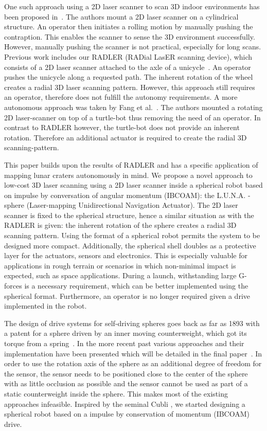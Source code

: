 \documentclass[graybox]{svmult}
\newcommand{\1}{\mathbbm{1}}                 %
\begin{document}
One such approach using a 2D laser scanner to scan 3D indoor environments has been proposed in~\cite{classical_mechanics_scanner}.
The authors mount a 2D laser scanner on a cylindrical structure.
An operator then initiates a rolling motion by manually pushing the contraption.
This enables the scanner to sense the 3D environment successfully.
However, manually pushing the scanner is not practical, especially for long scans.
%
Previous work includes our RADLER (RADial LasER scanning device), which consists of a 2D laser scanner attached to the axle of a unicycle~\cite{ISER2018}.
An operator pushes the unicycle along a requested path.
The inherent rotation of the wheel creates a radial 3D laser scanning pattern.
However, this approach still requires an operator, therefore does not fulfill the autonomy requirements. 
%
A more autonomous approach was taken by Fang et al.~\cite{3D_per_2D_based}.
The authors mounted a rotating 2D laser-scanner on top of a turtle-bot thus removing the need of an operator.
In contrast to RADLER however, the turtle-bot does not provide an inherent rotation.
Therefore an additional actuator is required to create the radial 3D scanning-pattern. 

This paper builds upon the results of RADLER and has a specific application of mapping lunar craters autonomously in mind.
We propose a novel approach to low-cost 3D laser scanning using a 2D laser scanner inside a spherical robot based on impulse by conversation of angular momentum (IBCOAM): the L.U.N.A. - sphere (Laser-mapping Unidirectional Navigation Actuator).
The 2D laser scanner is fixed to the spherical structure, hence a similar situation as with the RADLER is given: the inherent rotation of the sphere creates a radial 3D scanning pattern.
Using the format of a spherical robot permits the system to be designed more compact. 
Additionally, the spherical shell doubles as a protective layer for the actuators, sensors and electronics. 
This is especially valuable for applications in rough terrain or scenarios in which non-minimal impact is expected, such as space applications.
During a launch, withstanding large G-forces is a necessary requirement, which can be better implemented using the spherical format. 
Furthermore, an operator is no longer required given a drive implemented in the robot.

The design of drive systems for self-driving spheres goes back as far as 1893 with a patent for a sphere driven by an inner moving counterweight, which got its torque from a spring~\cite{tate1893sphere}.
In the more recent past various approaches and their implementation have been presented which will be detailed in the final paper~\cite{soa1,soa2,soa3,soa4,soa5,soa6,soa7}.
In order to use the rotation axis of the sphere as an additional degree of freedom for the sensor, the sensor needs to be positioned close to the center of the sphere with as little occlusion as possible and the sensor cannot be used as part of a static counterweight inside the sphere.
This makes most of the existing approaches infeasible.
Inspired by the seminal Cubli \cite{cubliIROS12}, we started designing a spherical robot based on a impulse by conservation of momentum (IBCOAM) drive. 
\end{document}
